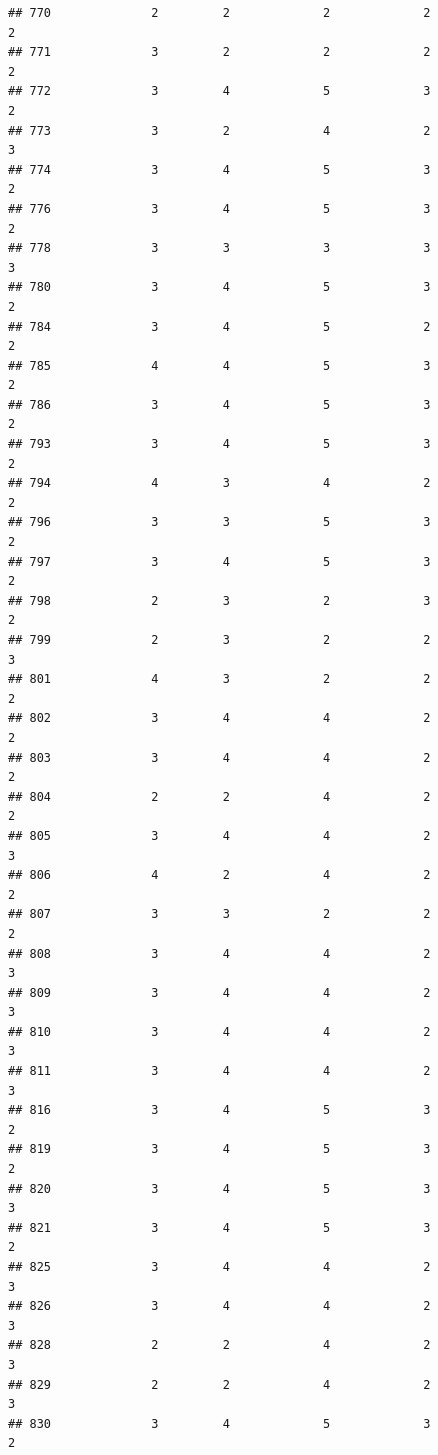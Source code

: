 \documentclass[
]{article}
\begin{document}
\begin{verbatim}
## 770              2         2             2             2           2
## 771              3         2             2             2           2
## 772              3         4             5             3           2
## 773              3         2             4             2           3
## 774              3         4             5             3           2
## 776              3         4             5             3           2
## 778              3         3             3             3           3
## 780              3         4             5             3           2
## 784              3         4             5             2           2
## 785              4         4             5             3           2
## 786              3         4             5             3           2
## 793              3         4             5             3           2
## 794              4         3             4             2           2
## 796              3         3             5             3           2
## 797              3         4             5             3           2
## 798              2         3             2             3           2
## 799              2         3             2             2           3
## 801              4         3             2             2           2
## 802              3         4             4             2           2
## 803              3         4             4             2           2
## 804              2         2             4             2           2
## 805              3         4             4             2           3
## 806              4         2             4             2           2
## 807              3         3             2             2           2
## 808              3         4             4             2           3
## 809              3         4             4             2           3
## 810              3         4             4             2           3
## 811              3         4             4             2           3
## 816              3         4             5             3           2
## 819              3         4             5             3           2
## 820              3         4             5             3           3
## 821              3         4             5             3           2
## 825              3         4             4             2           3
## 826              3         4             4             2           3
## 828              2         2             4             2           3
## 829              2         2             4             2           3
## 830              3         4             5             3           2

\end{verbatim}
\end{document}
